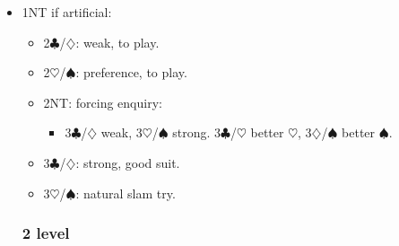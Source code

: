 \documentclass[a4paper,14pt]{extarticle}
\begin{document}
\begin{itemize}
\item 1NT if artificial:
	\begin{itemize}
   \item 2$\clubsuit$/$\diamondsuit$: weak, to play.
   \item 2$\heartsuit$/$\spadesuit$: preference, to play.
   \item 2NT: forcing enquiry:
\label{note:7}
		\begin{itemize}
      \item 3$\clubsuit$/$\diamondsuit$ weak, 3$\heartsuit$/$\spadesuit$ strong. 3$\clubsuit$/$\heartsuit$ better $\heartsuit$, 3$\diamondsuit$/$\spadesuit$ better $\spadesuit$.
		\end{itemize}
   \item 3$\clubsuit$/$\diamondsuit$: strong, good suit.
   \item 3$\heartsuit$/$\spadesuit$: natural slam try.
	\end{itemize}

\newpage

\subsubsection{2 level}
\label{sec:resp:2level}
\label{note:18}


\end{itemize}
\end{document}
